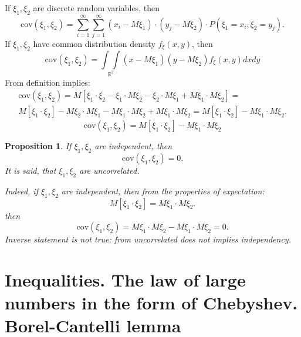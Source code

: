 \documentclass[12pt,letterpaper]{report}
\newtheorem{proposition}[theorem]{Proposition}  %
\begin{document}
If $\xi_1, \xi_2$ are discrete random variables, then
\begin{equation}
    \text{cov}(\xi_1, \xi_2) = \sum_{i=1}^{\infty}\sum_{j=1}^{\infty} (x_i - M\xi_1) \cdot (y_j - M\xi_2) \cdot P(\xi_1 = x_i, \xi_2 = y_j).
\end{equation}
If $\xi_1,\xi_2$ have common distribution density $f_{\xi}(x,y)$, then 
\begin{equation}
    \text{cov}(\xi_1,\xi_2) = \underset{\mathbb{R}^2}{\int\int}(x-M\xi_1)(y-M\xi_2) f_{\xi}(x,y)dxdy
\end{equation}
From definition implies:
\begin{gather*}
    \text{cov}(\xi_1, \xi_2) = M[\xi_1\cdot\xi_2 - \xi_1\cdot M\xi_2 - \xi_2\cdot M\xi_1 + M\xi_1 \cdot M\xi_2] = \\
    M[\xi_1\cdot\xi_2] - M\xi_2\cdot M\xi_1 - M\xi_1\cdot M\xi_2 + M\xi_1 \cdot M\xi_2 =
    M[\xi_1 \cdot \xi_2] - M\xi_1 \cdot M\xi_2.
\end{gather*}
\begin{equation}
    \text{cov}(\xi_1,\xi_2) = M[\xi_1\cdot\xi_2] - M\xi_1\cdot M\xi_2
\end{equation}

\begin{proposition}
    If $\xi_1, \xi_2$ are independent, then
    \[
        \text{cov}(\xi_1, \xi_2) = 0
    .\] 
    It is said, that $\xi_1,\xi_2$ are uncorrelated.

    Indeed, if $\xi_1, \xi_2$ are independent, then from the properties of expectation:
    \[
        M[\xi_1\cdot\xi_2] = M\xi_1\cdot M\xi_2
    .\] 
    then 
    \[
        \text{cov}(\xi_1,\xi_2) = M\xi_1\cdot M\xi_2 - M\xi_1\cdot M\xi_2 = 0
    .\] 
    Inverse statement is not true: from uncorrelated does not implies independency.
\end{proposition}




\chapter{Inequalities. The law of large numbers in the form of Chebyshev.
Borel-Cantelli lemma}
\end{document}
